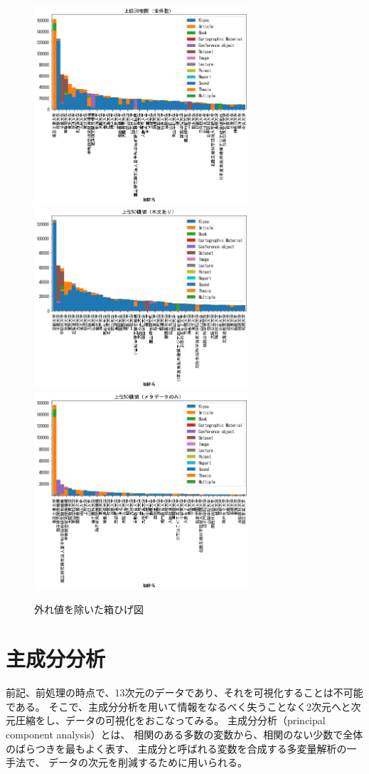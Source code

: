 \documentclass[submit,noauthor]{ono}
\begin{document}
\begin{figure}[h]
	\includegraphics[width=8cm]{./picture/stack_all.png}
	\includegraphics[width=8cm]{./picture/stack_honbun.png}
	\includegraphics[width=8cm]{./picture/stack_sabun.png}
	\caption{外れ値を除いた箱ひげ図}
	\label{fig:box1}
\end{figure}


\section{主成分分析}
\label{PCA}
前記、前処理の時点で、13次元のデータであり、それを可視化することは不可能である。
そこで、主成分分析を用いて情報をなるべく失うことなく2次元へと次元圧縮をし、データの可視化をおこなってみる。
主成分分析（principal component analysis）とは、
相関のある多数の変数から、相関のない少数で全体のばらつきを最もよく表す、
主成分と呼ばれる変数を合成する多変量解析の一手法で、
データの次元を削減するために用いられる。
\end{document}

